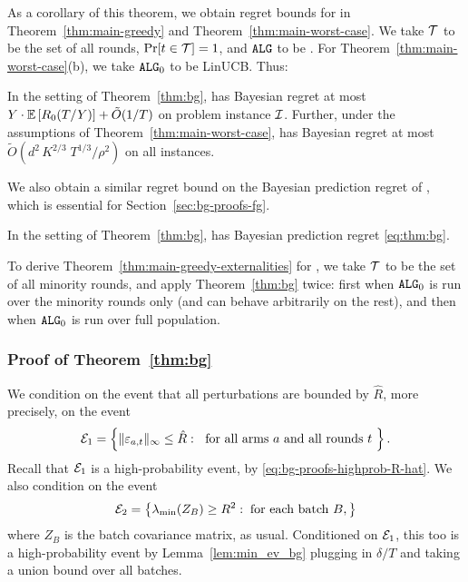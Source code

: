  As a corollary of this theorem, we obtain regret bounds for \bg in Theorem~\ref{thm:main-greedy} and Theorem~\ref{thm:main-worst-case}. We take $\mathcal{T}$ to be the set of all rounds, \ie $\Pr[t \in \mathcal{T}] = 1$, and $\mathtt{ALG}$ to be \bg. For Theorem~\ref{thm:main-worst-case}(b), we take $\mathtt{ALG}_0$ to be LinUCB. Thus:

\begin{corollary}
In the setting of Theorem~\ref{thm:bg}, \bg has Bayesian regret at most
    $Y \cdot \mathbb{E}\left[R_0(T/Y)\right] + \tilde O(1/T)$
on problem instance $\mathcal{I}$. Further, under the assumptions of Theorem~\ref{thm:main-worst-case}, \bg has Bayesian regret at most
    $\tilde O(d^2\,K^{2/3}\;T^{1/3}/\rho^2)$
on all instances.
\end{corollary}

We also obtain a similar regret bound on the Bayesian prediction regret of \fg, which is essential for Section~\ref{sec:bg-proofs-fg}.

\begin{corollary}\label{cor:thm-bg-fg}
In the setting of Theorem~\ref{thm:bg}, \fg has Bayesian prediction regret \eqref{eq:thm:bg}.
\end{corollary}


To derive Theorem~\ref{thm:main-greedy-externalities} for \bg, we take $\mathcal{T}$ to be the set of all minority rounds, and apply Theorem~\ref{thm:bg} twice: first when $\mathtt{ALG}_0$ is run over the minority rounds only (and can behave arbitrarily on the rest), and then when $\mathtt{ALG}_0$ is run over full population.

\subsubsection{Proof of Theorem~\ref{thm:bg}}
\label{sec:thm-bg-pf}

We condition on the event that all perturbations are bounded by $\hat{R}$, more precisely, on the event
\begin{align}\label{eq:thm:bg-pf-E1}
\mathcal{E}_1 = \left\{ \|\varepsilon_{a,t}\|_\infty \leq \hat R:\;
    \text{ for all arms $a$ and all rounds $t$ } \right\}.
\end{align}
Recall that $\mathcal{E}_1$ is a high-probability event, by \eqref{eq:bg-proofs-highprob-R-hat}.
We also condition on the event
\[
  \mathcal{E}_2 = \left\{ \lambda_{\min}(Z_B) \ge R^2
  : \; \text{for each batch $B$},\right\}
\]
where $Z_B$ is the batch covariance matrix, as usual. Conditioned on $\mathcal{E}_1$, this too is a high-probability event by
Lemma~\ref{lem:min_ev_bg} plugging in $\delta/T$ and taking a union bound over
all batches.

